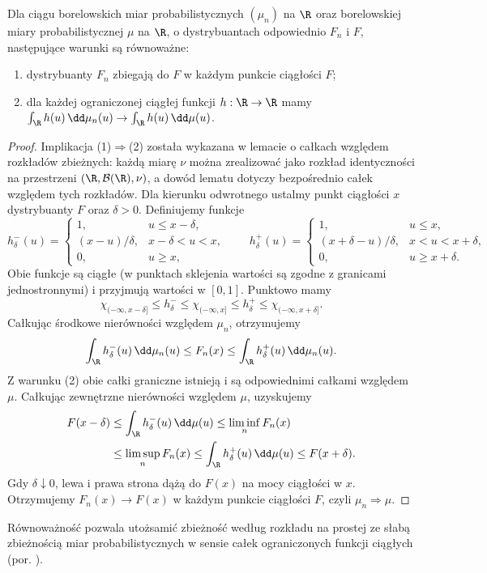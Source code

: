 \begin{twierdzenie}
Dla ciągu borelowskich miar probabilistycznych $(\mu_n)$
na $\R$ oraz borelowskiej miary probabilistycznej $\mu$
na $\R$, o dystrybuantach odpowiednio $F_n$ i $F$,
następujące warunki są równoważne:
\begin{enumerate}
\item dystrybuanty $F_n$ zbiegają do $F$ w każdym
punkcie ciągłości $F$;
\item dla każdej ograniczonej ciągłej funkcji
$h:\R\to\R$ mamy
$\int_\R h(u)\,\dd\mu_n(u)\to\int_\R h(u)\,\dd\mu(u)$.
\end{enumerate}
\end{twierdzenie}
\begin{proof}
Implikacja (1)$\Rightarrow$(2) została wykazana w lemacie
o całkach względem rozkładów zbieżnych: każdą miarę $\nu$
można zrealizować jako rozkład identyczności na przestrzeni
$(\R,\mathcal B(\R),\nu)$, a dowód lematu dotyczy
bezpośrednio całek względem tych rozkładów.
Dla kierunku odwrotnego ustalmy punkt ciągłości $x$
dystrybuanty $F$ oraz $\delta>0$. Definiujemy funkcje
\[
h^-_\delta(u)=
\begin{cases}
1,&u\leq x-\delta,\\
(x-u)/\delta,&x-\delta<u<x,\\
0,&u\geq x,
\end{cases}
\qquad
h^+_\delta(u)=
\begin{cases}
1,&u\leq x,\\
(x+\delta-u)/\delta,&x<u<x+\delta,\\
0,&u\geq x+\delta.
\end{cases}
\]
Obie funkcje są ciągłe (w punktach sklejenia wartości
są zgodne z granicami jednostronnymi) i przyjmują
wartości w $[0,1]$. Punktowo mamy
\[
\chi_{(-\infty,x-\delta]}\leq h^-_\delta
\leq\chi_{(-\infty,x]}\leq h^+_\delta
\leq\chi_{(-\infty,x+\delta]}.
\]
Całkując środkowe nierówności względem $\mu_n$, otrzymujemy
\[
\int_\R h^-_\delta(u)\,\dd\mu_n(u)
\leq F_n(x)\leq
\int_\R h^+_\delta(u)\,\dd\mu_n(u).
\]
Z warunku (2) obie całki graniczne istnieją i są
odpowiednimi całkami względem $\mu$. Całkując zewnętrzne
nierówności względem $\mu$, uzyskujemy
\[
\begin{aligned}
F(x-\delta)&\leq\int_\R h^-_\delta(u)\,\dd\mu(u)
\leq\liminf_nF_n(x)\\
&\leq\limsup_nF_n(x)
\leq\int_\R h^+_\delta(u)\,\dd\mu(u)
\leq F(x+\delta).
\end{aligned}
\]
Gdy $\delta\downarrow0$, lewa i prawa strona
dążą do $F(x)$ na mocy ciągłości w $x$.
Otrzymujemy $F_n(x)\to F(x)$ w każdym punkcie
ciągłości $F$, czyli $\mu_n\Rightarrow\mu$.
\end{proof}
Równoważność pozwala utożsamić zbieżność według rozkładu
na prostej ze słabą zbieżnością miar probabilistycznych
w sensie całek ograniczonych funkcji ciągłych
(por. ).

